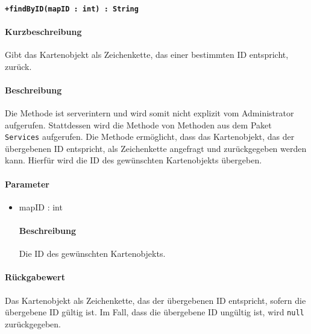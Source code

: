\paragraph*{\texttt{+findByID(mapID : int) : String}}%
\paragraph*{Kurzbeschreibung}
Gibt das Kartenobjekt als Zeichenkette, das einer bestimmten ID entspricht, zurück.
\paragraph*{Beschreibung}
Die Methode ist serverintern und wird somit nicht explizit vom Administrator aufgerufen.
Stattdessen wird die Methode von Methoden aus dem Paket \texttt{Services} aufgerufen.
Die Methode ermöglicht, dass das Kartenobjekt, das der übergebenen ID entspricht, als Zeichenkette angefragt und zurückgegeben werden kann.
Hierfür wird die ID des gewünschten Kartenobjekts übergeben.
\paragraph*{Parameter}
\begin{itemize}
    \item mapID : int
    		\paragraph*{Beschreibung}
    		Die ID des gewünschten Kartenobjekts.
\end{itemize}
\paragraph*{Rückgabewert}
Das Kartenobjekt als Zeichenkette, das der übergebenen ID entspricht, sofern die übergebene ID gültig ist.
Im Fall, dass die übergebene ID ungültig ist, wird \texttt{null} zurückgegeben.
